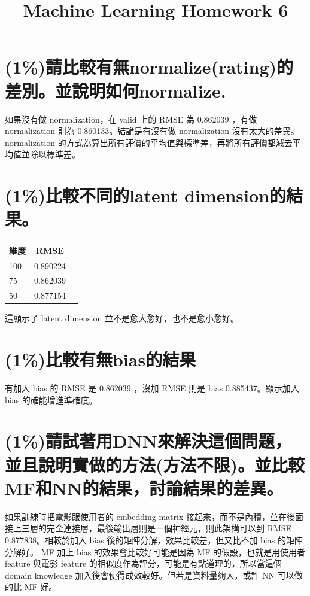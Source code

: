 \documentclass[fleqn,a4paper,12pt]{article}
\title{Machine Learning Homework 6}
\date{}
\begin{document}
\thispagestyle{fancy}

\section{(1\%)請比較有無normalize(rating)的差別。並說明如何normalize.}

如果沒有做 normalization，在 valid 上的 RMSE 為 0.862039 ，有做 normalization 則為 0.860133。結論是有沒有做 normalization 沒有太大的差異。normalization 的方式為算出所有評價的平均值與標準差，再將所有評價都減去平均值並除以標準差。

\section{(1\%)比較不同的latent dimension的結果。}

\begin{tabular}[c]{| l | c | r |}
  \hline
  維度 & RMSE \\ \hline
  100 & 0.890224 \\ \hline
  75 & 0.862039 \\ \hline
  50 & 0.877154 \\ \hline
\end{tabular}

這顯示了 latent dimension 並不是愈大愈好，也不是愈小愈好。

\section{(1\%)比較有無bias的結果}

有加入 bias 的 RMSE 是 0.862039 ，沒加 RMSE 則是 bias 0.885437。顯示加入 bias 的確能增進準確度。

\section{(1\%)請試著用DNN來解決這個問題，並且說明實做的方法(方法不限)。並比較MF和NN的結果，討論結果的差異。}

如果訓練時把電影跟使用者的 embedding matrix 接起來，而不是內積，並在後面接上三層的完全連接層，最後輸出層則是一個神經元，則此架構可以到 RMSE 0.877838。相較於加入 bias 後的矩陣分解，效果比較差，但又比不加 bias 的矩陣分解好。 MF 加上 bias 的效果會比較好可能是因為 MF 的假設，也就是用使用者 feature 與電影 feature 的相似度作為評分，可能是有點道理的，所以當這個 domain knowledge 加入後會使得成效較好。但若是資料量夠大，或許 NN 可以做的比 MF 好。
\end{document}
